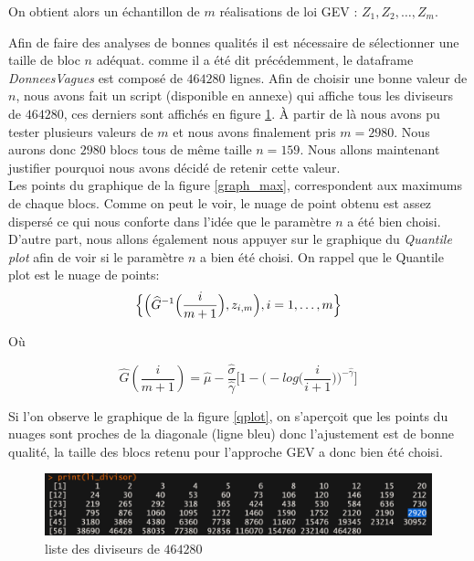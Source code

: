 \documentclass[a4paper,french,10pt]{article}
\begin{document}
On obtient alors un échantillon de $m$ réalisations de loi GEV : $Z_1, Z_2,\dots, Z_m$. %

 Afin de faire des analyses de bonnes qualités il est nécessaire de sélectionner une taille de bloc $n$ adéquat. comme il a été dit précédemment, le dataframe \textit{DonneesVagues} est composé de $464280$ lignes.
Afin de choisir une bonne valeur de $n$, nous avons fait un script (disponible en annexe) qui affiche tous les diviseurs de $464280$, ces derniers sont affichés en figure \ref{diviseurs}. À partir de là nous avons pu tester plusieurs valeurs de $m$ et nous avons finalement pris $m=2980$. Nous aurons donc $2980$ blocs tous de même taille $n=159$. Nous allons maintenant justifier pourquoi nous avons décidé de retenir cette valeur. \\
Les points du graphique de la figure \ref{graph_max}, correspondent aux maximums de chaque blocs. Comme on peut le voir, le nuage de point obtenu est assez dispersé ce qui nous conforte dans l'idée que le paramètre $n$ a été bien choisi. \\
D'autre part, nous allons également nous appuyer sur le graphique du \textit{Quantile plot} afin de voir si le paramètre $n$ a bien été choisi. On rappel que le Quantile plot est le nuage de points: \\

\[
	\Bigl\{\Big(\widehat{G}^{-1}\Big(\frac{i}{m+1}\Big),z_{i,m}\Big), i = 1,\dots, m\Bigr\}
\]

Où

\[
	\widehat{G}(\frac{i}{m+1}) = \widehat{\mu} - \frac{\widehat{\sigma}}{\widehat{\gamma}} \Big[ 1- \Big(-log\Big(\frac{i}{i+1}\Big)\Big)^{-\widehat{\gamma}}\Big]
\]

Si l'on observe le graphique de la figure \ref{qplot}, on s'aperçoit que les points du nuages sont proches de la diagonale (ligne bleu) donc l'ajustement est de bonne qualité, la taille des blocs retenu pour l'approche GEV a donc bien été choisi. 


\begin{figure}[htp] 
	\centering
	\includegraphics[scale=0.45]{images/diviseurs.png}
	\caption{liste des diviseurs de $464280$}
	\label{diviseurs}
\end{figure}
 
\end{document}
